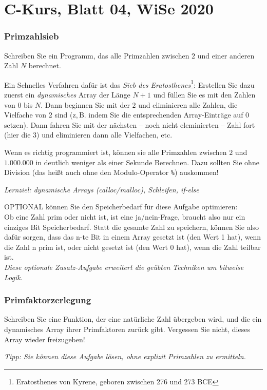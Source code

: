 \documentclass[
	ngerman,
	fontsize=10pt,
	parskip=half,
	titlepage=true,
	DIV=12
]{scrartcl}
\begin{document}
\part*{C-Kurs, Blatt 04, WiSe 2020}

\section{Primzahlsieb}
Schreiben Sie ein Programm, das alle Primzahlen zwischen $2$ und einer anderen Zahl $N$ berechnet.

Ein Schnelles Verfahren dafür ist das \emph{Sieb des Eratosthenes}\footnote
	{Eratosthenes von Kyrene, geboren zwischen 276 und 273 BCE}:
Erstellen Sie dazu zuerst ein {\em dynamisches} Array der Länge $N+1$ und füllen Sie es mit den Zahlen von $0$ bis $N$. Dann beginnen Sie mit der $2$ und eliminieren alle Zahlen, die Vielfache von $2$ sind (z,\,B. indem Sie die entsprechenden Array-Einträge auf $0$ setzen). 
Dann fahren Sie mit der nächsten -- noch nicht eleminierten -- Zahl fort (hier die $3$) und eliminieren dann alle Vielfachen, etc.

Wenn es richtig programmiert ist, können sie alle Primzahlen zwischen $2$ und $1.000.000$ in deutlich weniger als einer Sekunde Berechnen. Dazu sollten Sie ohne Division (das heißt auch ohne den Modulo-Operator \texttt{\%}) auskommen!

\emph{Lernziel: dynamische Arrays (calloc/malloc), Schleifen, if-else}

OPTIONAL können Sie den Speicherbedarf für diese Aufgabe optimieren:\\
Ob eine Zahl prim oder nicht ist, ist eine ja/nein-Frage, braucht also nur ein einziges Bit Speicherbedarf. Statt die gesamte Zahl zu speichern, können Sie also dafür sorgen, dass das n-te Bit in einem Array gesetzt ist (den Wert 1 hat), wenn die Zahl n prim ist, oder nicht gesetzt ist (den Wert 0 hat), wenn die Zahl teilbar ist.\\
\emph{Diese optionale Zusatz-Aufgabe erweitert die geübten Techniken um bitweise Logik.}


\section{Primfaktorzerlegung}
Schreiben Sie eine Funktion, der eine natürliche Zahl übergeben wird, und die ein dynamisches Array ihrer Primfaktoren zurück gibt. Vergessen Sie nicht, dieses Array wieder freizugeben!

\emph{Tipp: Sie können diese Aufgabe lösen, ohne explizit Primzahlen zu ermitteln.}
\end{document}
